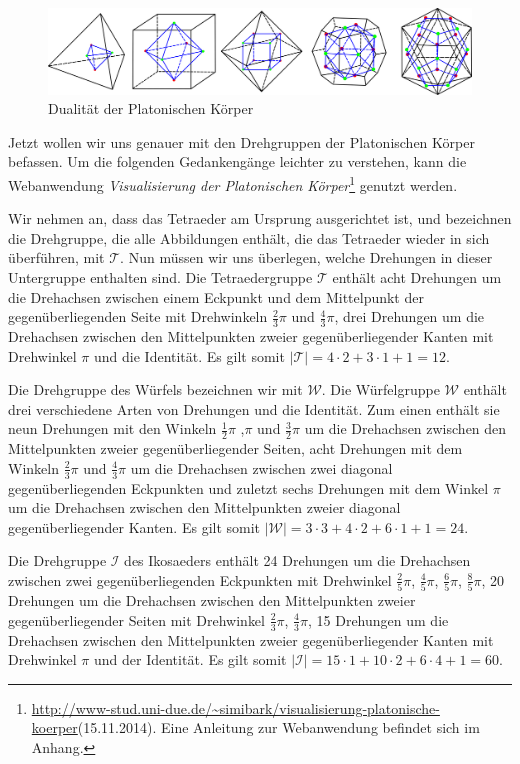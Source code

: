 \begin{figure}[H]
\centering
\includegraphics[width=0.9\linewidth]{grafiken/dual_platonische_koerper.pdf}
\caption{Dualität der Platonischen Körper}
\label{fig:Dual_Platonische_Koerper}
\end{figure}

Jetzt wollen wir uns genauer mit den Drehgruppen der Platonischen Körper befassen. Um die folgenden Gedankengänge leichter zu verstehen, kann die Webanwendung \textit{Visualisierung der Platonischen Körper}\footnote{\url{http://www-stud.uni-due.de/~simibark/visualisierung-platonische-koerper}(15.11.2014). Eine Anleitung zur Webanwendung befindet sich im Anhang.} genutzt werden.

Wir nehmen an, dass das Tetraeder am Ursprung ausgerichtet ist, und bezeichnen die Drehgruppe, die alle Abbildungen enthält, die das Tetraeder wieder in sich überführen, mit $\mathcal{T}$. Nun müssen wir uns überlegen, welche Drehungen in dieser Untergruppe enthalten sind. Die Tetraedergruppe $\mathcal{T}$ enthält acht Drehungen um die Drehachsen zwischen einem Eckpunkt und dem Mittelpunkt der gegenüberliegenden Seite mit Drehwinkeln $\frac{2}{3}\pi$ und $\frac{4}{3}\pi$, drei Drehungen um die Drehachsen zwischen den Mittelpunkten zweier gegenüberliegender Kanten mit Drehwinkel $\pi$ und die Identität. Es gilt somit $| \mathcal{T} | = 4 \cdot 2 + 3 \cdot 1 + 1 = 12$.

Die Drehgruppe des Würfels bezeichnen wir mit $\mathcal{W}$. Die Würfelgruppe $\mathcal{W}$ enthält drei verschiedene Arten von Drehungen und die Identität. Zum einen enthält sie neun Drehungen mit den Winkeln $\frac{1}{2}\pi$ ,$\pi$ und $\frac{3}{2}\pi$ um die Drehachsen zwischen den Mittelpunkten zweier gegenüberliegender Seiten, acht Drehungen mit dem Winkeln $\frac{2}{3}\pi$ und $\frac{4}{3}\pi$ um die Drehachsen zwischen zwei diagonal gegenüberliegenden Eckpunkten und zuletzt sechs Drehungen mit dem Winkel $\pi$ um die Drehachsen zwischen den Mittelpunkten zweier diagonal gegenüberliegender Kanten. Es gilt somit $| \mathcal{W} | = 3 \cdot 3 + 4 \cdot 2 + 6 \cdot 1 + 1 = 24$.

Die Drehgruppe $\mathcal{I}$ des Ikosaeders enthält 24 Drehungen um die Drehachsen zwischen zwei gegenüberliegenden Eckpunkten mit Drehwinkel $\frac{2}{5}\pi$, $\frac{4}{5}\pi$, $\frac{6}{5}\pi$, $\frac{8}{5}\pi$, 20 Drehungen um die Drehachsen zwischen den Mittelpunkten zweier gegenüberliegender Seiten mit Drehwinkel $\frac{2}{3}\pi$, $\frac{4}{3}\pi$, 15 Drehungen um die Drehachsen zwischen den Mittelpunkten zweier gegenüberliegender Kanten mit Drehwinkel $\pi$ und der Identität. Es gilt somit $| \mathcal{I} | = 15 \cdot 1 + 10 \cdot 2 + 6 \cdot 4 + 1 = 60$.

